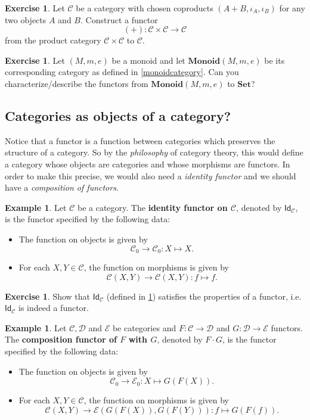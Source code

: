 \documentclass[a4paper,10pt]{scrartcl}
\theoremstyle{plain}
\theoremstyle{definition}
\newtheorem{exa}[thm]{Example}
\newtheorem{exer}[thm]{Exercise}
\newcommand{\cfont}[1]{\ensuremath{\mathsf{#1}}}
\newcommand{\Cat}[1]{\mathcal{#1}}
\newcommand{\CC}{\Cat{C}}
\newcommand{\DD}{\Cat{D}}
\newcommand{\EE}{\Cat{E}}
\newcommand{\Catb}[1]{\mathbf{#1}}
\newcommand{\SET}{\Catb{Set}}
\newcommand{\MON}{\Catb{Monoid}}
\newcommand{\Ob}[1]{{#1}_0}
\newcommand{\CHom}[3]{{#1}(#2,#3)}
\newcommand{\Id}[1][]{\cfont{Id}_{#1}}
\newcommand{\Comp}{\cdot}
\begin{document}
\begin{exer}
  Let $\CC$ be a category with chosen coproducts $(A + B, \iota_A, \iota_B)$ for any two objects $A$ and $B$.
  Construct a functor
  \[ (+) : \CC\times \CC \to \CC\]
  from the product category $\CC\times \CC$ to $\CC$.
\end{exer}


\begin{exer}\label{ex:monoid_functors} Let $(M,m,e)$ be a monoid and let $\MON(M,m,e)$ be its corresponding category as defined in \cref{monoidcategory}. Can you characterize/describe the functors from $\MON(M,m,e)$ to $\SET$?
\end{exer}

\subsection{Categories as objects of a category?}
Notice that a functor is a function between categories which preserves the structure of a category. So by the \textit{philosophy} of category theory, this would define a category whose objects are categories and whose morphisms are functors. In order to make this precise, we would also need a \textit{identity functor} and we should have a \textit{composition of functors}.

\begin{exa}\label{example:functor_id} Let $\CC$ be a category. The \textbf{identity functor on $\CC$}, denoted by $\Id[\CC]$, is the functor specified by the following data:
\begin{itemize}
\item The function on objects is given by
\[
\Ob{\CC}\to \Ob{\CC}: X\mapsto X.
\]
\item For each $X,Y\in\CC$, the function on morphisms is given by
\[
\CHom \CC X Y\to \CHom \CC X Y: f\mapsto f.
\]
\end{itemize}
\end{exa}

\begin{exer} Show that $\Id[\CC]$ (defined in \cref{example:functor_id}) satisfies the properties of a functor, i.e. $\Id[\CC]$ is indeed a functor.
\end{exer}

\begin{exa}\label{example:functor_comp} Let $\CC,\DD$ and $\EE$ be  categories and $F:\CC\to\DD$ and $G:\DD\to\EE$ functors. The \textbf{composition functor of $F$ with $G$}, denoted by $F\Comp G$, is the functor specified by the following data:
\begin{itemize}
\item The function on objects is given by
\[
\Ob{\CC}\to \Ob{\EE}: X\mapsto G(F(X)).
\]
\item For each $X,Y\in\CC$, the function on morphisms is given by
\[
\CHom \CC X Y\to \CHom{\EE}{G(F(X))}{G(F(Y))}: f\mapsto G(F(f)).
\]
\end{itemize}
\end{exa}
\end{document}
